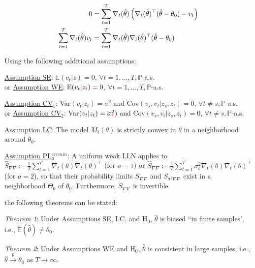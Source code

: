 \documentclass[11pt,a4paper,notitlepage]{article}
\numberwithin{equation}{section}
\begin{document}
\begin{align}
0 &= \sum\limits_{t=1}^T \nabla_t(\hat{\theta}) \left(\nabla_t(\tilde{\theta})^\top(\hat{\theta}-\theta_0)-v_t\right)\notag\\
\sum\limits_{t=1}^T \nabla_t(\hat{\theta})v_t &= \sum\limits_{t=1}^T \nabla_t(\hat{\theta})\nabla_t(\tilde{\theta})^\top(\hat{\theta}-\theta_0)
\label{eq:kwok_FOC2}
\end{align}

Using the following additional assumptions:
\begin{adjustwidth}{30 pt}{0 pt}
\underline{Assumption SE}: $\mathbb{E}(v_t|z)=0$, $\forall t=1,\dots,T, \mathbb{P}$-a.s.\\
or \underline{Assumption WE}: $\mathbb{E}(v_t|z_{\color{red}t})=0$, $\forall t=1,\dots,T, \mathbb{P}$-a.s.

\underline{Assumption CV$_1$}: Var$(v_t|z_t)=\sigma^2$ and Cov$(v_s,v_t|z_s,z_t)=0$, $\forall t\neq s, \mathbb{P}$-a.s.\\
or \underline{Assumption CV$_2$}: Var$(v_t|z_t)=\sigma^2_{\color{red}t})$ and Cov$(v_s,v_t|z_s,z_t)=0$, $\forall t\neq s, \mathbb{P}$-a.s.

\underline{Assumption LC}: The model $M_t(\theta)$ is strictly convex in $\theta$ in a neighborhood around $\theta_0$.

\underline{Assumption PL$_{a}^{errmin}$}: A uniform weak LLN applies to $\hat{S}_{\nabla\nabla}\coloneqq\frac{1}{T}\sum_{t=1}^T \nabla_t(\theta)\nabla_t(\theta)^\top$ (for $a=1$) or $\hat{S}_{\nabla\nabla}\coloneqq\frac{1}{T}\sum_{t=1}^T \sigma_t^2\nabla_t(\theta)\nabla_t(\theta)^\top$ (for $a=2$), so that their probability limits $S_{\nabla\nabla}$ and $S_{\sigma^2\nabla\nabla}$ exist in a neighborhood $\Theta_0$ of $\theta_0$. Furthermore, $S_{\nabla\nabla}$ is invertible.
\end{adjustwidth}

the following theorems can be stated: 
\begin{adjustwidth}{30 pt}{0 pt}
\emph{Theorem 1}: Under Assumptions SE, LC, and H$_0$, $\hat{\theta}$ is biased ``in finite samples", i.e., $\mathbb{E}(\hat{\theta})\neq\theta_0$.
\end{adjustwidth}

\begin{adjustwidth}{30 pt}{0 pt}
\emph{Theorem 2}: Under Assumptions WE and H$_0$, $\hat{\theta}$ is consistent in large samples, i.e., $\hat{\theta}\overset{p}{\rightarrow} \theta_0$ as $T\rightarrow\infty$.
\end{adjustwidth}
\end{document}
